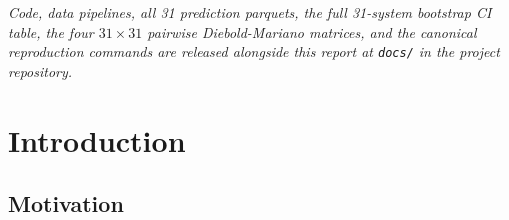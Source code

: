 \documentclass[10pt, a4paper, twocolumn]{article}
\begin{document}
\begin{abstract}
Three findings stand out. First, a meta-router composite combining
four residual-corrected models for the Normal regime, LightGBM-hijri
for Ramadan, and a Heat-wave ensemble of Chronos-Bolt and Time-MoE
achieves aggregate MAE \num{838.8} MW (95\% CI [\num{750.8},
\num{948.7}]), a $-13.4\%$ improvement over the strongest single
model (Chronos-Bolt-Base at $L{=}720$, MAE \num{968.9}). Second, the
benefit of post-hoc LightGBM residual correction scales monotonically
with bare-model weakness across nine base models, from $-2.1\%$ on
Chronos to $-47.7\%$ on SARIMAX. Third, identical Hijri features
applied via two different injection paths produce opposite outcomes:
ingesting them into the HuggingFace covariate API of TimesFM and
Moirai \emph{hurts} Ramadan MAE by 14--25\% with high statistical
significance, while applying them through a post-hoc LightGBM
residual head \emph{helps} the same models on Ramadan by 9--22\%.
We argue this constitutes a clean empirical demonstration that, for
zero-shot foundation models, post-hoc residual correction is a
principled and reliable mechanism for injecting domain-specific
calendar structure where in-band covariate paths fail --- and that
the resulting meta-router pipeline is a deployable template for
any hot, predominantly Muslim Mediterranean grid (Egypt included)
that operates under the same Ramadan, Eid, and heat-wave stresses.
\end{abstract}

\vfill
\noindent\small\textit{Code, data pipelines, all 31 prediction
parquets, the full 31-system bootstrap CI table, the four
$31{\times}31$ pairwise Diebold-Mariano matrices, and the canonical
reproduction commands are released alongside this report at
\texttt{docs/} in the project repository.}

\section{Introduction}
\label{sec:intro}

\subsection{Motivation}
\end{document}

